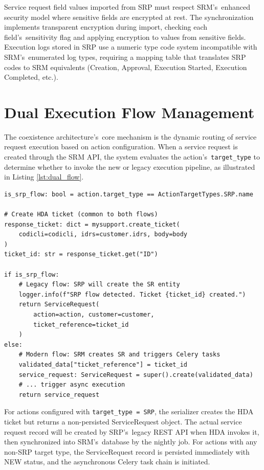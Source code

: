 Service request field values imported from SRP must respect SRM's~enhanced security model where sensitive fields are encrypted at rest. The synchronization implements transparent encryption during import, checking each field's~sensitivity flag and applying encryption to values from sensitive fields. Execution logs stored in SRP use a numeric type code system incompatible with SRM's~enumerated log types, requiring a mapping table that translates SRP codes to SRM equivalents (Creation, Approval, Execution Started, Execution Completed, etc.).

\section{Dual Execution Flow Management}

The coexistence architecture's~core mechanism is the dynamic routing of service request execution based on action configuration. When a service request is created through the SRM API, the system evaluates the action's~\texttt{target\_type} to determine whether to invoke the new or legacy execution pipeline, as illustrated in Listing \ref{lst:dual_flow}.

\begin{listing}[htbp]
\begin{verbatim}
is_srp_flow: bool = action.target_type == ActionTargetTypes.SRP.name

# Create HDA ticket (common to both flows)
response_ticket: dict = mysupport.create_ticket(
    codicli=codicli, idrs=customer.idrs, body=body
)
ticket_id: str = response_ticket.get("ID")

if is_srp_flow:
    # Legacy flow: SRP will create the SR entity
    logger.info(f"SRP flow detected. Ticket {ticket_id} created.")
    return ServiceRequest(
        action=action, customer=customer, 
        ticket_reference=ticket_id
    )
else:
    # Modern flow: SRM creates SR and triggers Celery tasks
    validated_data["ticket_reference"] = ticket_id
    service_request: ServiceRequest = super().create(validated_data)
    # ... trigger async execution
    return service_request
\end{verbatim}
\caption{Dual Execution Flow Routing Logic}
\label{lst:dual_flow}
\end{listing}

For actions configured with \texttt{target\_type = SRP}, the serializer creates the HDA ticket but returns a non-persisted ServiceRequest object. The actual service request record will be created by SRP's~legacy REST API when HDA invokes it, then synchronized into SRM's~database by the nightly job. For actions with any non-SRP target type, the ServiceRequest record is persisted immediately with NEW status, and the asynchronous Celery task chain is initiated.

